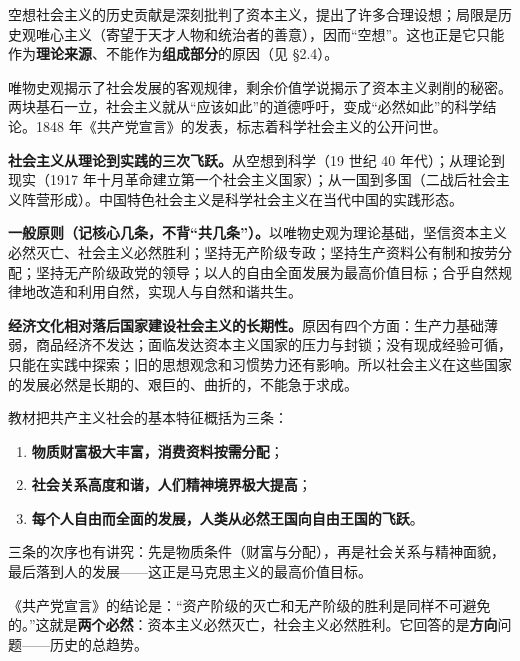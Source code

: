 \documentclass[11pt]{ctexart}
\newcommand{\dw}[1]{\textbf{\color{violetdeep}#1}}   %
\let\origsubhdr\subhdr
\renewcommand{\subhdr}[1]{\par\needspace{4\baselineskip}\origsubhdr{#1}}
\begin{document}
空想社会主义的历史贡献是深刻批判了资本主义，提出了许多合理设想；局限是历史观唯心主义（寄望于天才人物和统治者的善意），因而“空想”。这也正是它只能作为\dw{理论来源}、不能作为\dw{组成部分}的原因（见 §2.4）。


唯物史观揭示了社会发展的客观规律，剩余价值学说揭示了资本主义剥削的秘密。两块基石一立，社会主义就从“应该如此”的道德呼吁，变成“必然如此”的科学结论。1848 年《共产党宣言》的发表，标志着科学社会主义的公开问世。

\textbf{社会主义从理论到实践的三次飞跃。}从空想到科学（19 世纪 40 年代）；从理论到现实（1917 年十月革命建立第一个社会主义国家）；从一国到多国（二战后社会主义阵营形成）。中国特色社会主义是科学社会主义在当代中国的实践形态。


\textbf{一般原则（记核心几条，不背“共几条”）。}以唯物史观为理论基础，坚信资本主义必然灭亡、社会主义必然胜利；坚持无产阶级专政；坚持生产资料公有制和按劳分配；坚持无产阶级政党的领导；以人的自由全面发展为最高价值目标；合乎自然规律地改造和利用自然，实现人与自然和谐共生。

\textbf{经济文化相对落后国家建设社会主义的长期性。}原因有四个方面：生产力基础薄弱，商品经济不发达；面临发达资本主义国家的压力与封锁；没有现成经验可循，只能在实践中探索；旧的思想观念和习惯势力还有影响。所以社会主义在这些国家的发展必然是长期的、艰巨的、曲折的，不能急于求成。


教材把共产主义社会的基本特征概括为三条：

\begin{enumerate}[label=（\arabic*）,leftmargin=2.4em]
\item \dw{物质财富极大丰富，消费资料按需分配}；
\item \dw{社会关系高度和谐，人们精神境界极大提高}；
\item \dw{每个人自由而全面的发展，人类从必然王国向自由王国的飞跃}。
\end{enumerate}

三条的次序也有讲究：先是物质条件（财富与分配），再是社会关系与精神面貌，最后落到人的发展——这正是马克思主义的最高价值目标。


《共产党宣言》的结论是：“资产阶级的灭亡和无产阶级的胜利是同样不可避免的。”这就是\dw{两个必然}：资本主义必然灭亡，社会主义必然胜利。它回答的是\dw{方向}问题——历史的总趋势。
\end{document}
